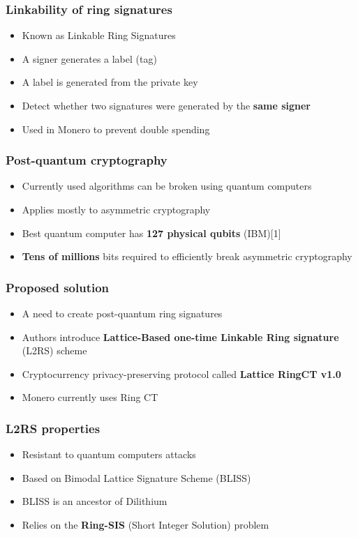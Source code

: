 \documentclass[%
  14pt,       				%
	c,                  %
	aspectratio=1610,   %
	unicode,						%
]{beamer}				    	%
\begin{document}
\begin{frame} 
  \frametitle{Linkability of ring signatures}
  \large{
    \begin{itemize}
      \item Known as Linkable Ring Signatures
      \item A signer generates a label (tag)
      \item A label is generated from the private key
      \item Detect whether two signatures were generated by the \textbf{same signer}
      \item Used in Monero to prevent double spending
    \end{itemize}
  }
\end{frame}

\begin{frame} 
  \frametitle{Post-quantum cryptography}
  \large{
    \begin{itemize}
      \item Currently used algorithms can be broken using quantum computers
      \item Applies mostly to asymmetric cryptography
      \item Best quantum computer has \textbf{127 physical qubits} (IBM)[1]
      \item \textbf{Tens of millions} bits required to efficiently break asymmetric cryptography
    \end{itemize}
  }
\end{frame}

\begin{frame}
  \frametitle{Proposed solution}
  \large{
    \begin{itemize}
      \item A need to create post-quantum ring signatures
      \item Authors introduce \textbf{Lattice-Based one-time Linkable Ring signature} (L2RS) scheme
      \item Cryptocurrency privacy-preserving protocol called \textbf{Lattice RingCT v1.0}
      \item Monero currently uses Ring CT
    \end{itemize}
  }
\end{frame}

\begin{frame}
  \frametitle{L2RS properties}
  \large{
    \begin{itemize}
			\item Resistant to quantum computers attacks
      \item Based on Bimodal Lattice Signature Scheme (BLISS)
      \item BLISS is an ancestor of Dilithium
      \item Relies on the \textbf{Ring-SIS} (Short Integer Solution) problem
    \end{itemize}
  }
\end{frame}
\end{document}
